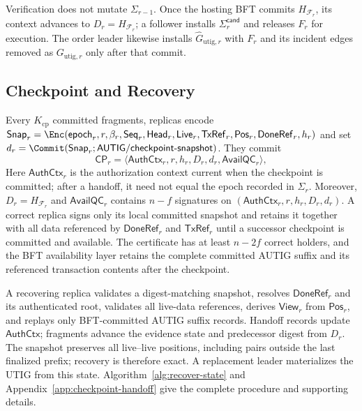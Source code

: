 Verification does not mutate $\Sigma_{r-1}$. Once the hosting BFT commits $H_{\mathcal F_r}$, its context advances to $D_r=H_{\mathcal F_r}$; a follower
installs $\Sigma_r^{\mathsf{cand}}$ and releases $F_r$ for execution. The order leader likewise installs $\widehat G_{\mathrm{utig},r}$ with $F_r$ and its incident edges removed as $G_{\mathrm{utig},r}$ only after that commit.

\subsection{Checkpoint and Recovery}
\label{sec:checkpoint-recovery}

Every $K_{\mathrm{cp}}$ committed fragments, replicas encode $\mathsf{Snap}_r=\Enc(\mathsf{epoch}_r,r,\beta_r,\mathsf{Seq}_r,
\mathsf{Head}_r,\mathsf{Live}_r,\mathsf{TxRef}_r,\mathsf{Pos}_r,
\mathsf{DoneRef}_r,h_r)$ and set
$d_r=\Commit(\mathsf{Snap}_r;\mathsf{AUTIG/checkpoint\mbox{-}snapshot})$. They commit
\begin{equation}
 \mathsf{CP}_r=\langle\mathsf{AuthCtx}_r,r,h_r,D_r,d_r,
                       \mathsf{AvailQC}_r\rangle,
 \label{eq:checkpoint}
\end{equation}
Here $\mathsf{AuthCtx}_r$ is the authorization context current when the checkpoint is committed; after a handoff, it need not equal the epoch recorded in $\Sigma_r$.  Moreover, $D_r=H_{\mathcal F_r}$ and $\mathsf{AvailQC}_r$ contains $n-f$ signatures on $(\mathsf{AuthCtx}_r,r,h_r,D_r,d_r)$.  A correct replica signs only its local committed snapshot and retains it together with all data referenced by $\mathsf{DoneRef}_r$ and $\mathsf{TxRef}_r$ until a successor checkpoint is
committed and available.  The certificate has at least $n-2f$ correct holders, and the BFT availability layer retains the complete committed AUTIG suffix and its referenced transaction contents after the checkpoint.

A recovering replica validates a digest-matching snapshot, resolves $\mathsf{DoneRef}_r$ and its authenticated root, validates all live-data references, derives $\mathsf{View}_r$ from $\mathsf{Pos}_r$, and replays only BFT-committed AUTIG suffix records.  Handoff records update $\mathsf{AuthCtx}$; fragments advance the evidence state and predecessor digest from $D_r$.  The snapshot preserves all live--live positions, including pairs outside the last finalized prefix; recovery is
therefore exact.  A replacement leader materializes the UTIG from this state. Algorithm~\ref{alg:recover-state} and Appendix~\ref{app:checkpoint-handoff} give the complete procedure and supporting details.

